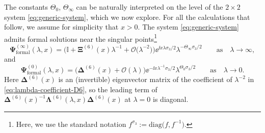 The constants $\Theta_0$, $\Theta_\infty$ can be naturally interpreted on the level of the $2 \times 2$ system \eqref{eq:generic-system}, which we now explore. For all the calculations that follow, we assume for simplicity that $x > 0$. The system \eqref{eq:generic-system} admits formal solutions near the singular points\footnote{Here, we use the standard notation $f^{\sigma_3} := \mathrm{diag}\big(f, f^{-1}\big)$.}
\begin{equation}
\mathbf{\Psi}_{\text{formal}}^{(\infty)}(\lambda, x) = \big( \mathbb{I} +\mathbf{\Xi}^{(6)}(x)\lambda^{-1}+ \mathcal{O}\big(\lambda^{-2}\big) \big) \ee^{\ii x \lambda \sigma_3 /2} \lambda^{-\Theta_\infty \sigma_3/2} \qquad \text{as} \quad \lambda \to \infty,
\label{eq:formal-infty}
\end{equation}
and
\begin{equation}
\mathbf{\Psi}^{(0)}_{\text{formal}}(\lambda, x) = \big( \mathbf{\Delta}^{(6)}(x) + \mathcal{O}(\lambda) \big) \ee^{-\ii x \lambda^{-1} \sigma_3 /2} \lambda^{\Theta_0 \sigma_3/2} \qquad \text{as} \quad \lambda \to 0.
\label{eq:formal-zero}
\end{equation}
Here $\mathbf{\Delta}^{(6)}(x)$ is an (invertible) eigenvector matrix of the coefficient of $\lambda^{-2}$ in \eqref{eq:lambda-coefficient-D6}, so the leading term of $\mathbf{\Delta}^{(6)}(x)^{-1}\mathbf{\Lambda}^{(6)}(\lambda,x)\mathbf{\Delta}^{(6)}(x)$ at $\lambda=0$ is diagonal.

